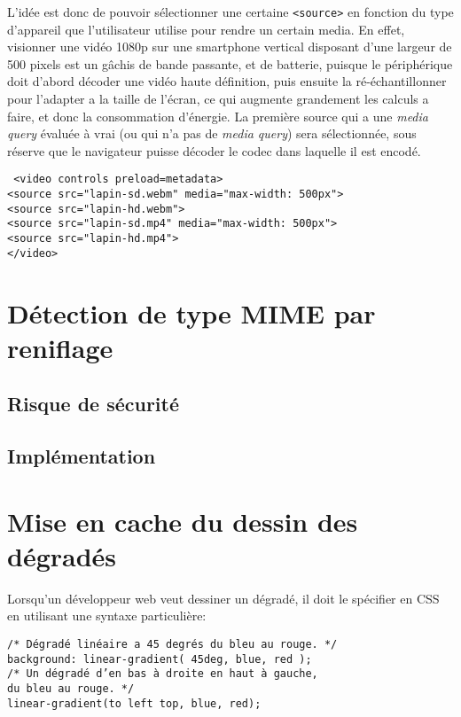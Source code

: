 \documentclass[a4paper,10pt]{article}
\newcommand{\cc}[1]{\texttt{#1}}
\begin{document}
\begin{multicols}{2}
  L'idée est donc de pouvoir sélectionner une certaine \cc{<source>} en fonction
  du type d'appareil que l'utilisateur utilise pour rendre un certain media. En
  effet, visionner une vidéo 1080p sur une smartphone vertical disposant d'une
  largeur de 500 pixels est un gâchis de bande passante, et de batterie, puisque
  le périphérique doit d'abord décoder une vidéo haute définition, puis ensuite
  la ré-échantillonner pour l'adapter a la taille de l'écran, ce qui augmente
  grandement les calculs a faire, et donc la consommation d'énergie. La première
  source qui a une \emph{media query} évaluée à vrai (ou qui n'a pas de \emph{media
  query}) sera sélectionnée, sous réserve que le navigateur puisse décoder le
  codec dans laquelle il est encodé.

  \noindent
  {\footnotesize
    \cc{%
      <video controls preload=metadata>\\
      <source src="lapin-sd.webm" media="max-width: 500px">\\
      <source src="lapin-hd.webm">\\
      <source src="lapin-sd.mp4" media="max-width: 500px">\\
      <source src="lapin-hd.mp4">\\
      </video>\\
    }
  }

  \section{Détection de type MIME par reniflage}
    \subsection{Risque de sécurité}
    \subsection{Implémentation}
  \section{Mise en cache du dessin des dégradés}

  Lorsqu'un développeur web veut dessiner un dégradé, il doit le spécifier en
  CSS en utilisant une syntaxe particulière:

    \noindent
  {\footnotesize
  \cc{/* Dégradé linéaire a 45 degrés du bleu au rouge. */\\
    background: linear-gradient( 45deg, blue, red );\\
    /* Un dégradé d'en bas à droite en haut à gauche,\\
       du bleu au rouge. */\\
    linear-gradient(to left top, blue, red);\\
  }}


\end{multicols}
\end{document}
